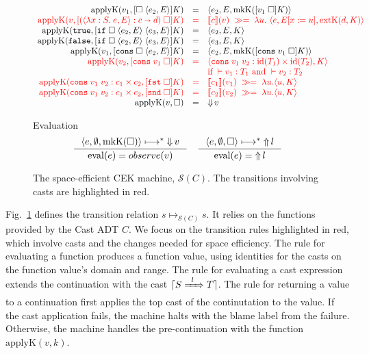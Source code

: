 \documentclass[runningheads]{llncs}
\newcommand{\infr}[2]{\inference{#1}{#2}}
\newcommand{\highlight}[1]{{\color{red} #1}}
\newcommand{\sidecond}[1]{\text{if}\;#1}
\newcommand{\figequalto}[3]{#1 & = & #2 & #3 \\}
\newcommand{\figequaltoH}[3]{\highlight{#1} & \highlight{=} & \highlight{#2} & 
\highlight{#3} \\}
\newcommand{\figref}[1]{Fig.~\ref{#1}}
\newcommand{\SMachine}[1]{\ensuremath{\mathcal{S}(#1)}}
\newcommand{\error}[1]{\ensuremath{\mathop{\Uparrow}#1}}
\newcommand{\Pfunc}[2]{\ensuremath{#1 \shortrightarrow #2}}
\newcommand{\Pprod}[2]{\ensuremath{#1 \times #2}}
\newcommand{\elam}[3]{\lambda#1:#2.\;#3}
\newcommand{\eapp}[2]{#1\;#2}
\newcommand{\eif}[3]{\mathtt{if}\;#1\;#2\;#3}
\newcommand{\econs}[2]{\mathtt{cons} \; #1 \; #2}
\newcommand{\efst}[1]{\mathtt{fst} \; #1}
\newcommand{\esnd}[1]{\mathtt{snd} \; #1}
\newcommand{\ecast}[2]{\ensuremath{#1 : #2}}
\newcommand{\ccast}[3]{#1 \xRightarrow[]{\enskip #2 \enskip} #3}
\newcommand{\vtrue}[0]{\mathtt{true}}
\newcommand{\vfalse}[0]{\mathtt{false}}
\newcommand{\vfunc}[4]{\langle\elam{#1}{#2}{#3},#4\rangle}
\newcommand{\vcons}[2]{\econs{#1}{#2}}
\newcommand{\sexpr}[3]{\ensuremath{\langle#1,#2,#3\rangle}}
\newcommand{\scont}[2]{\ensuremath{\langle#1,#2\rangle}}
\newcommand{\shalt}[1]{\ensuremath{\mathop{\Downarrow} #1}}
\newcommand{\Knil}[0]{\Box}
\newcommand{\Kcons}[2]{[#1]#2}
\newcommand{\closure}[2]{\langle#1,#2\rangle}
\newcommand{\FappXO}[2]{\eapp{\square}{\closure{#1}{#2}}}
\newcommand{\FappOX}[1]{\eapp{#1}{\square}}
\newcommand{\Fif}[3]{\eif{\square}{\closure{#1}{#3}}{\closure{#2}{#3}}}
\newcommand{\FconsXO}[2]{\econs{\square}{\closure{#1}{#2}}}
\newcommand{\FconsOX}[1]{\econs{#1}{\square}}
\newcommand{\Ffst}[0]{\efst{\square}}
\newcommand{\Fsnd}[0]{\esnd{\square}}
\newcommand{\mbind}[0]{\ensuremath{\;\gg=\;}}
\newcommand{\denote}[1]{\ensuremath{\llbracket #1 \rrbracket}}
\newcommand{\translate}[1]{\ensuremath{\lceil#1\rceil}}
\newcommand{\id}[1]{\ensuremath{\mathrm{id}(#1)}}
\newcommand{\mkContName}[0]{\ensuremath{\mathrm{mkK}}}
\newcommand{\mkCont}[1]{\ensuremath{\mkContName(#1)}}
\newcommand{\extContName}[0]{\ensuremath{\mathrm{extK}}}
\newcommand{\extCont}[2]{\ensuremath{\extContName(#1,#2)}}
\newcommand{\applyContName}[0]{\ensuremath{\mathrm{applyK}}}
\newcommand{\applyCont}[2]{\ensuremath{\applyContName(#1,#2)}}
\newcommand{\valuetyping}[2]{\ensuremath{\vdash #1 : #2}}
\newcommand{\casttyping}[3]{\ensuremath{\vdash #1 : #2 \Longrightarrow #3}}
\newcommand{\transitivelyreduceto}[2]{\ensuremath{#1 \longmapsto^{*} #2}}
\newcommand{\reducetoS}[3]{\ensuremath{#2 \longmapsto_{\SMachine{#1}} #3}}
\newcommand{\evalto}[2]{\ensuremath{\mathrm{eval}(#1)=#2}}
\begin{document}
\begin{figure}[tp]
	\fbox{$\applyCont{v}{k}=s$}
	\[
	\begin{array}{rclr}
	\figequalto{\applyCont{v_1}{\Kcons{\FappXO{e_2}{E}}{K}}}{\sexpr{e_2}{E}{
			\mkCont{\Kcons{\FappOX{v_1}}{K}}}
	}{}
	\figequaltoH{
		\applyCont{v}{\Kcons{\FappOX{(\ecast{\vfunc{x}{S}{e}{E}}{\Pfunc{c}{d}})}}{K}}
	}{
		\denote{c}(v) \mbind \lambda u. \
		\sexpr{e}{E[x:=u]}{\extCont{d}{K}}
	}{}
	\figequalto{\applyCont{\vtrue}{\Kcons{\Fif{e_2}{e_3}{E}}{K}}}{\sexpr{e_2}{E}{K}}{}
	\figequalto{\applyCont{\vfalse}{\Kcons{\Fif{e_2}{e_3}{E}}{K}}}{\sexpr{e_3}{E}{K}}{}
	\figequalto{\applyCont{v_1}{\Kcons{\FconsXO{e_2}{E}}{K}}}{
		\sexpr{e_2}{E}{\mkCont{\Kcons{\FconsOX{v_1}}{K}}}
	}{}
	\figequaltoH{\applyCont{v_2}{\Kcons{\FconsOX{v_1}}{K}}}{
		\scont{\ecast{\vcons{v_1}{v_2}}{\Pprod{\id{T_1}}{\id{T_2}}}}{K}
	}{}
	& & 
	\highlight{\sidecond{
		\valuetyping{v_1}{T_1}
		\text{ and }
		\valuetyping{v_2}{T_2}
	}}
	\\
	\figequaltoH{
		\applyCont{\ecast{\vcons{v_1}{v_2}}{\Pprod{c_1}{c_2}}}{\Kcons{\Ffst}{K}}
	}{
		\denote{c_1}(v_1) \mbind \lambda u.
		\scont{u}{K}
	}{}
	\figequaltoH{
		\applyCont{\ecast{\vcons{v_1}{v_2}}{\Pprod{c_1}{c_2}}}{\Kcons{\Fsnd}{K}}
	}{
		\denote{c_2}(v_2) \mbind \lambda u.
		\scont{u}{K}
	}{}
	\figequalto{\applyCont{v}{\Knil}}{\shalt{v}}{}
	\end{array}
	\]
	
	\fbox{\evalto{e}{o}} Evaluation
	\[
	\inference{
		\transitivelyreduceto{\sexpr{e}{\emptyset}{\mkCont{\Knil}}}{\shalt{v}}
	}{
		\evalto{e}{observe(v)}
	} \quad
	\infr{
		\transitivelyreduceto{\sexpr{e}{\emptyset}{\Knil}}{\error{l}}
	}{
		\evalto{e}{\error{l}}}
	\]
	\caption{The space-efficient CEK machine, \SMachine{C}.
          The transitions involving casts are highlighted in red.}
	\label{fig:semachine-dynamics}
\end{figure}

\figref{fig:semachine-dynamics} defines the transition relation
$\reducetoS{C}{s}{s}$. It relies on the functions provided by the Cast
ADT $C$.
%
We focus on the transition rules highlighted in red, which involve
casts and the changes needed for space efficiency.
%
The rule for evaluating a function produces a function value, using
identities for the casts on the function value's domain and range.
%
The rule for evaluating a cast expression extends the continuation
with the cast \translate{\ccast{S}{l}{T}}.
%
The rule for returning a value to a continuation first applies the top
cast of the continutation to the value. If the cast application fails,
the machine halts with the blame label from the failure. Otherwise,
the machine handles the pre-continuation with the function
$\applyCont{v}{k}$.
\end{document}
